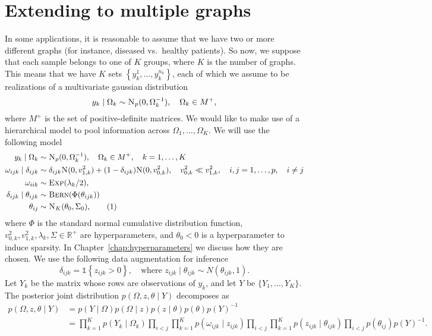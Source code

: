 \documentclass[a4paper, 11pt, oneside]{report}
\newcommand{\1}{\mathds{1}}
\newcommand{\inv}{^{-1}}
\newcommand{\Np}{\textsc{N}_p}
\newcommand{\Nor}{\textsc{N}}
\newcommand{\Bern}{\textsc{Bern}}
\newcommand{\Exp}{\textsc{Exp}}
\begin{document}
\chapter{Extending to multiple graphs}\label{chap:multigraph}
In some applications, it is reasonable to assume that we have two or more different graphs (for instance, diseased vs.\ healthy patients).
So now, we suppose that each sample belongs to one of $K$ groups, where $K$ is the number of graphs.
This means that we have $K$ sets $\left\{y_k^1, \dots, y_k^{n_k}\right\}$, each of which we assume to be realizations of a multivariate gaussian distribution \[y_k \mid \Omega_k \sim \Np(0, \Omega_k\inv), \quad \Omega_k \in M^+,\] where $M^+$ is the set of positive-definite matrices.
We would like to make use of a hierarchical model to pool information across $\Omega_1,\dots,\Omega_K$.
We will use the following model
\begin{align*}
	y_k \mid \Omega_k              & \sim \Np(0, \Omega_k^{-1}),\quad \Omega_k \in M^+, \quad k=1,\dots,K                                                                     \\
  \omega_{ijk} \mid \delta_{ijk} & \sim \delta_{ijk} \Nor(0, v_{1,k}^2) + (1 - \delta_{ijk}) \Nor(0, v_{0,k}^2),  \quad v_{0,k}^2 \ll v_{1,k}^2, \quad i,j = 1,\dots,p,\quad i \neq j \\
	\omega_{iik}                   & \sim \Exp(\lambda_k/2),                                                                                           \\
  \delta_{ijk} \mid \theta_{ijk} & \sim \Bern(\Phi(\theta_{ijk})) \\
	\theta_{ij}                    & \sim \textsc{N}_K(\theta_0, \Sigma_0),\stepcounter{equation}\tag{\theequation}\label{eq:mg-model}
\end{align*}
where $\Phi$ is the standard normal cumulative distribution function, $v_{0,k}^2,
v_{1,k}^2, \lambda_k, \Sigma \in \mathbb{R}^+$ are hyperparameters, and $\theta_0 < 0$ is a hyperparameter to induce sparsity.
In Chapter~\ref{chap:hyperparameters} we discuss how they are chosen.
We use the following data augmentation for inference
\[\delta_{ijk} = \1\left\{z_{ijk} > 0\right\}, \quad \text{where } z_{ijk} \mid \theta_{ijk} \sim N\left(\theta_{ijk}, 1\right).\]
Let $Y_k$ be the matrix whose rows are observations of $y_k$, and let $Y$
be $\{Y_1,\dots,Y_K\}$.
The posterior joint distribution $p(\Omega,  z, \theta \mid Y)$ decomposes as
\begin{align}\label{eq:decomp-join}
	p(\Omega,  z, \theta \mid Y) & = p(Y \mid \Omega) p(\Omega \mid z)
	p(z \mid \theta) p(\theta) p(Y)\inv \nonumber                            \\
	                                   & = \prod_{k=1}^K p(Y_k \mid \Omega_k)
	\prod_{i < j}\prod_{k=1}^K p(\omega_{ijk}
	\mid z_{ijk}) \prod_{i < j}\prod_{k=1}^K
	p(z_{ijk} \mid \theta_{ijk})\prod_{i <
		j} p(\theta_{ij}) p(Y)\inv.
\end{align}
\end{document}
